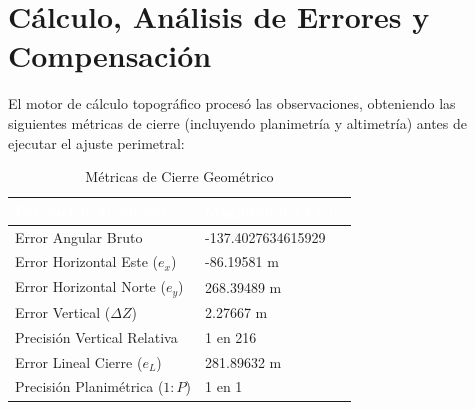 \documentclass[11pt,letterpaper]{article}
\begin{document}
\section{Cálculo, Análisis de Errores y Compensación}
El motor de cálculo topográfico procesó las observaciones, obteniendo las siguientes métricas de cierre (incluyendo planimetría y altimetría) antes de ejecutar el ajuste perimetral:
\begin{table}[H]
  \centering
  \caption{Métricas de Cierre Geométrico}
  \begin{tabular}{|l|l|}
    \hline
    \rowcolor{GeoBlue}
    \textcolor{white}{\textbf{Parámetro Analizado}} & \textcolor{white}{\textbf{Magnitud del Error}} \\
    \hline
    Error Angular Bruto & -137.4027634615929 \\
    \rowcolor{GeoBlue!5}
    Error Horizontal Este ($e_x$) & -86.19581 m \\
    Error Horizontal Norte ($e_y$) & 268.39489 m \\
    \rowcolor{white}
    Error Vertical ($\Delta Z$) & 2.27667 m \\
    Precisión Vertical Relativa & 1 en 216 \\
    \rowcolor{GeoBlue!5}
    Error Lineal Cierre ($e_L$) & 281.89632 m \\
    Precisión Planimétrica ($1:P$) & 1 en 1 \\
    \hline
  \end{tabular}
\end{table}
\end{document}
